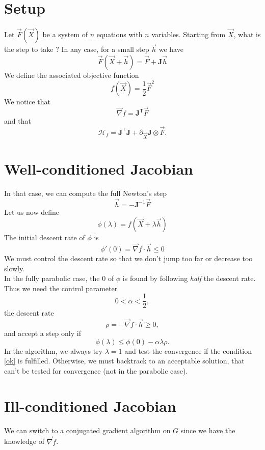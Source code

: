 \documentclass[aps,twocolumn]{revtex4}
\newcommand{\mymat}[1]{\boldsymbol{#1}}
\newcommand{\mytrn}[1]{{#1}^{\mathsf{T}}}
\newcommand{\mygrad}{\vec{\nabla}}
\newcommand{\myhess}{\mathcal{H}}
\begin{document}
\section{Setup}
Let $\vec{F}\left(\vec{X}\right)$ be a system of $n$ equations with $n$ variables.
Starting from $\vec{X}$, what is the step to take ?
In any case, for a small step $\vec{h}$ we have
\begin{equation}
	\vec{F}\left(\vec{X}+\vec{h}\right) = \vec{F} + \mymat{J} \vec{h}
\end{equation}
We define the associated objective function
\begin{equation}
	f\left(\vec{X}\right) = \frac{1}{2} \vec{F}^2
\end{equation}
We notice that
\begin{equation}
	\mygrad f = \mytrn{\mymat{J}}\vec{F}
\end{equation}
and that
\begin{equation}
	\myhess_f = \mytrn{\mymat{J}}\mymat{J} + \partial_{\vec{X}}\mymat{J} \otimes \vec{F}.
\end{equation}


\section{Well-conditioned Jacobian}
In that case, we can compute the full Newton's step
\begin{equation}
	\vec{h} = - \mymat{J}^{-1} \vec{F}
\end{equation}
Let us now define
\begin{equation}
	\phi(\lambda) =  f \left(\vec{X} + \lambda \vec{h}\right)
\end{equation}
The initial descent rate of $\phi$ is
\begin{equation}
	\phi'(0) = \mygrad f \cdot \vec{h} \leq 0
\end{equation}
We must control the descent rate so that we don't jump too far or decrease too slowly.\\
In the fully parabolic case, the 0 of $\phi$ is found by following \emph{half} the descent rate.
Thus we need the control parameter
\begin{equation}
	0 < \alpha < \frac{1}{2},
\end{equation}
the descent rate
\begin{equation}
	\rho = - \mygrad f \cdot \vec{h} \geq 0,
\end{equation}
and accept a step only if
\begin{equation}
	\label{ok}
	\phi(\lambda) \leq \phi(0) - \alpha \lambda \rho.
\end{equation}
In the algorithm, we always try $\lambda=1$ and test the convergence
if the condition \eqref{ok} is fulfilled.
Otherwise, we must backtrack to an acceptable solution, that can't be tested for convergence (not in
the parabolic case).

\section{Ill-conditioned Jacobian}
We can switch to a conjugated gradient algorithm on $G$ since we have the knowledge of $\mygrad f$.
\end{document}
